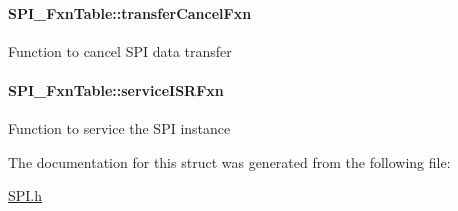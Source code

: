 \paragraph[{transfer\-Cancel\-Fxn}]{ S\-P\-I\-\_\-\-Fxn\-Table\-::transfer\-Cancel\-Fxn}\label{struct_s_p_i___fxn_table_a50f7f21536780c912dedf32c0918034c}
Function to cancel S\-P\-I data transfer 
\paragraph[{service\-I\-S\-R\-Fxn}]{ S\-P\-I\-\_\-\-Fxn\-Table\-::service\-I\-S\-R\-Fxn}\label{struct_s_p_i___fxn_table_a258c209814c001c5033463a2cb9cb9dd}
Function to service the S\-P\-I instance 

The documentation for this struct was generated from the following file\-:\begin{DoxyCompactItemize}
\item 
\hyperlink{_s_p_i_8h}{S\-P\-I.\-h}\end{DoxyCompactItemize}

